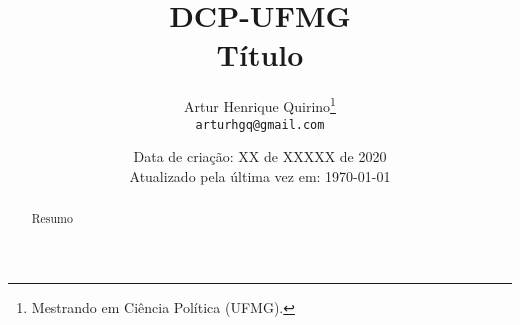 \documentclass[a4paper, 12pt, twoside]{article}
\title{{\footnotesize DCP-UFMG} \\ \Huge \bfseries Título}
\author{\Large Artur Henrique Quirino\thanks{Mestrando em Ciência Política (UFMG).} \\ \texttt{arturhgq@gmail.com}}
\date{\small Data de criação: XX de XXXXX de 2020 \\
	Atualizado pela última vez em: \today}
\begin{document}
\setcounter{tocdepth}{1}	
\tableofcontents

\newpage

\maketitle

\begin{abstract}
	Resumo
\end{abstract}

\frenchspacing
\onehalfspacing

\setlength{\parindent}{1em} %
\setlength{\parskip}{1em} %



\end{document}
